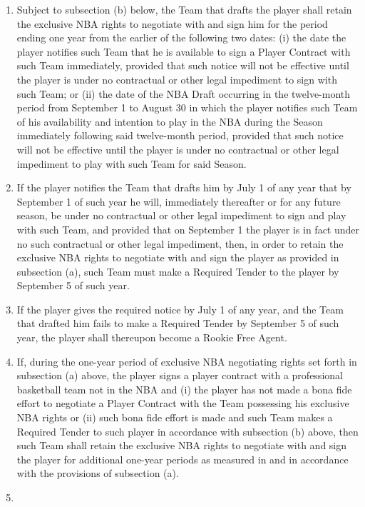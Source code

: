 \documentclass[
]{book}
\providecommand{\tightlist}{%
  \setlength{\itemsep}{0pt}\setlength{\parskip}{0pt}}
\begin{document}
\begin{enumerate}
\def\labelenumi{(\alph{enumi})}
\tightlist
\item
  Subject to subsection (b) below, the Team that drafts the player shall retain the exclusive NBA rights to negotiate with and sign him for the period ending one year from the earlier of the following two dates: (i) the date the player notifies such Team that he is available to sign a Player Contract with such Team immediately, provided that such notice will not be effective until the player is under no contractual or other legal impediment to sign with such Team; or (ii) the date of the NBA Draft occurring in the twelve-month period from September 1 to August 30 in which the player notifies such Team of his availability and intention to play in the NBA during the Season immediately following said twelve-month period, provided that such notice will not be effective until the player is under no contractual or other legal impediment to play with such Team for said Season.
\item
  If the player notifies the Team that drafts him by July 1 of any year that by September 1 of such year he will, immediately thereafter or for any future season, be under no contractual or other legal impediment to sign and play with such Team, and provided that on September 1 the player is in fact under no such contractual or other legal impediment, then, in order to retain the exclusive NBA rights to negotiate with and sign the player as provided in subsection (a), such Team must make a Required Tender to the player by September 5 of such year.
\item
  If the player gives the required notice by July 1 of any year, and the Team that drafted him fails to make a Required Tender by September 5 of such year, the player shall thereupon become a Rookie Free Agent.
\item
  If, during the one-year period of exclusive NBA negotiating rights set forth in subsection (a) above, the player signs a player contract with a professional basketball team not in the NBA and (i) the player has not made a bona fide effort to negotiate a Player Contract with the Team possessing his exclusive NBA rights or (ii) such bona fide effort is made and such Team makes a Required Tender to such player in accordance with subsection (b) above, then such Team shall retain the exclusive NBA rights to negotiate with and sign the player for additional one-year periods as measured in and in accordance with the provisions of subsection (a).
\item

\end{enumerate}
\end{document}
